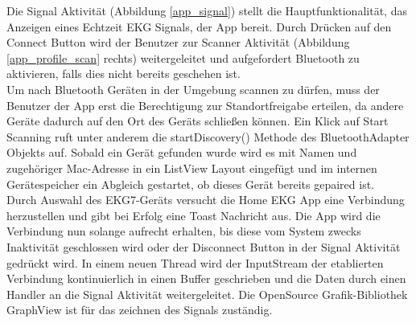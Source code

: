 Die Signal Aktivität (Abbildung \ref{app_signal}) stellt die Hauptfunktionalität, das Anzeigen eines Echtzeit EKG Signals, der App bereit. Durch Drücken auf den Connect Button wird der Benutzer zur Scanner Aktivität (Abbildung \ref{app_profile_scan} rechts) weitergeleitet und aufgefordert Bluetooth zu aktivieren, falls dies nicht bereits geschehen ist. \\
Um nach Bluetooth Geräten in der Umgebung scannen zu dürfen, muss der Benutzer der App erst die Berechtigung zur Standortfreigabe erteilen, da andere Geräte dadurch auf den Ort des Geräts schließen können.
Ein Klick auf Start Scanning ruft unter anderem die startDiscovery() Methode des BluetoothAdapter Objekts auf. Sobald ein Gerät gefunden wurde wird es mit Namen und zugehöriger Mac-Adresse in ein ListView Layout eingefügt und im internen Gerätespeicher ein Abgleich gestartet, ob dieses Gerät bereits gepaired ist. \\
Durch Auswahl des EKG7-Geräts versucht die Home EKG App eine Verbindung herzustellen und gibt bei Erfolg eine Toast Nachricht aus. Die App wird die Verbindung nun solange aufrecht erhalten, bis diese vom System zwecks Inaktivität geschlossen wird oder der Disconnect Button in  der Signal Aktivität gedrückt wird. In einem neuen Thread wird der InputStream der etablierten Verbindung kontinuierlich in einen Buffer geschrieben und die Daten durch einen Handler an die Signal Aktivität weitergeleitet. Die OpenSource Grafik-Bibliothek GraphView ist für das zeichnen des Signals zuständig.